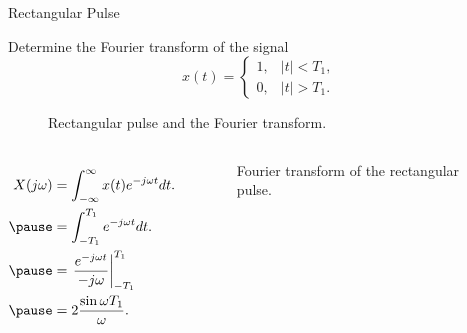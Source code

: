 \begin{frame}{Rectangular Pulse}
    \begin{example}
        Determine the Fourier transform of the signal
        \begin{equation*}
            x(t) = \begin{cases}
                1,& |t| < T_1,\\
                0, & |t| > T_1.
            \end{cases}
        \end{equation*}
    \end{example}
    \pause
    {
        \begin{figure}
          \centering
          
          \caption{Rectangular pulse and the Fourier transform.}\label{fi:square_pulse}
        \end{figure}
    }
\end{frame}

\begin{frame}
    {
        \begin{columns}
                \begin{equation*}
                    \begin{aligned}
                        X(j\omega) &= \int_{-\infty}^{\infty}x(t)e^{-j\omega t} dt.\\ \pause
                        &= \int_{-T_1}^{T_1} e^{-j\omega t} dt.\\ \pause
                        &= \left.\frac{e^{-j\omega t}}{-j\omega}\right|_{-T_1}^{T_1} \\ \pause
                        &= 2\frac{\sin \omega T_1}{\omega}.\\
                    \end{aligned}
                \end{equation*}
                \pause
                \begin{figure}
                  \centering
                  
                  \caption{Fourier transform of the rectangular pulse.}\label{fi:square_pulse_ft}
                \end{figure}
        \end{columns}
    }


\end{frame}


